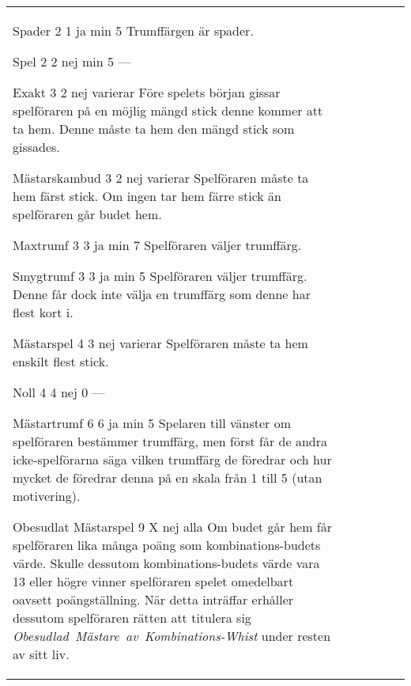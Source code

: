 \begin{table}
\begin{center}
\begin{tabularx}{\textwidth}{
			l
			S[table-number-alignment=center, table-format=1.0]
			S[table-number-alignment=center, table-format=1.0]
			cc|X
		}
				\standardBidItem%
				{Spader}
				{2}
				{1}
				{ja}
				{min 5}
				{%
					Trumffärgen är spader.
				}

				\standardBidItem%
				{Spel}
				{2}
				{2}
				{nej}
				{min 5}
				{%
					---
				}

				\standardBidItem%
				{Exakt}
				{3}
				{2}
				{nej}
				{varierar}
				{%
					Före spelets början gissar spelföraren på en möjlig mängd stick denne kommer att ta hem. Denne måste ta hem den mängd stick som gissades.
				}

				\standardBidItem%
				{Mästarskambud}
				{3}
				{2}
				{nej}
				{varierar}
				{%
					Spelföraren måste ta hem färst stick. Om ingen tar hem färre stick än spelföraren går budet hem.
				}

				\standardBidItem%
				{Maxtrumf}
				{3}
				{3}
				{ja}
				{min 7}
				{%
					Spelföraren väljer trumffärg.
				}

				\standardBidItem%
				{Smygtrumf}
				{3}
				{3}
				{ja}
				{min 5}
				{%
					Spelföraren väljer trumffärg. Denne får dock inte välja en trumffärg som denne har flest kort i.
				}

				\standardBidItem%
				{Mästarspel}
				{4}
				{3}
				{nej}
				{varierar}
				{%
					Spelföraren måste ta hem enskilt flest stick.
				}

				\standardBidItem%
				{Noll}
				{4}
				{4}
				{nej}
				{0}
				{%
					---
				}

				\standardBidItem%
				{Mästartrumf}
				{6}
				{6}
				{ja}
				{min 5}
				{%
					Spelaren till vänster om spelföraren bestämmer trumffärg, men först får de andra icke-spelförarna säga vilken trumffärg de föredrar och hur mycket de föredrar denna på en skala från 1 till 5 (utan motivering).
				}

				\standardBidItem%
				{Obesudlat Mästarspel}
				{9}
				{X}
				{nej}
				{alla}
				{%
					Om budet går hem får spelföraren lika många poäng som kombinations-budets värde. Skulle dessutom kombinations-budets värde vara 13 eller högre vinner spelföraren spelet omedelbart oavsett poängställning. När detta inträffar erhåller dessutom spelföraren rätten att titulera sig \emph{Obesudlad~Mästare~av~Kombinations-Whist} under resten av sitt liv.
				}
		\end{tabularx}
	\end{center}
\end{table}
